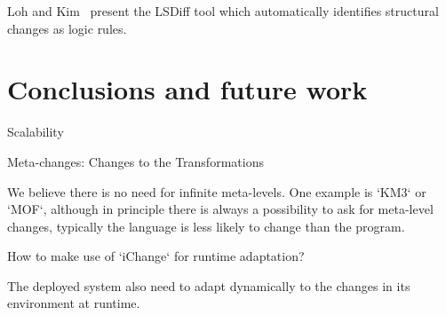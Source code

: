 \documentclass{acm_proc_article-sp}
\begin{document}
Loh and Kim~\cite{Loh:2010:LPD:1810295.1810348,Kim:2009:DRS:1555001.1555046} present the LSDiff tool which automatically identifies structural changes as logic rules.




\section{Conclusions and future work}

   Scalability
   
   Meta-changes: Changes to the Transformations
   
   We believe there is no need for infinite meta-levels. One example is `KM3` or `MOF`, although in principle there is always a possibility to ask for meta-level 
   changes, typically the language is less likely to change than the program.
   
   How to make use of `iChange` for runtime adaptation?
   
   The deployed system also need to adapt dynamically to the changes in its environment at runtime.
\cite{klint05tosem}  
\cite{cordy02} 
\cite{txl} 
\cite{wenzel08icse} 
\cite{xing05ase} 
\cite{fluri07tse}
\cite{schmidt08icse} 
\cite{wenzel08icsm}
\cite{brunet06gamma}
\cite{degenais08icse}
\cite{canfora09software}


\balancecolumns
\end{document}
